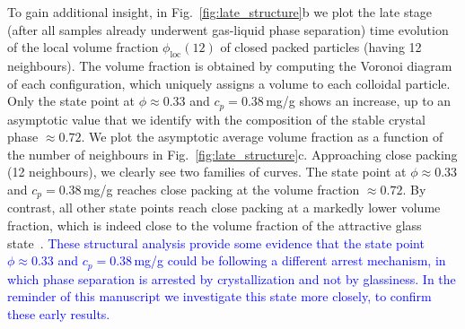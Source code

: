 \documentclass[preprint,amsmath,amssymb,superscriptaddress]{revtex4-1}
\begin{document}
To gain additional insight, in Fig.~\ref{fig:late_structure}b we plot the late stage (after all samples already underwent gas-liquid phase separation) time evolution of the local volume fraction $\phi_\mathrm{loc}(12)$ of closed packed particles (having 12 neighbours). The volume fraction is obtained by computing the Voronoi diagram of each configuration, which uniquely assigns a volume to each colloidal particle. Only the state point at $\phi\approx 0.33$ and $c_p = 0.38\,$mg/g shows an increase, up to an asymptotic value that we identify with the composition of the stable crystal phase $\approx 0.72$. We plot the asymptotic average volume fraction as a function of the number of neighbours in Fig.~\ref{fig:late_structure}c. Approaching close packing (12 neighbours), we clearly see two families of curves. The state point at $\phi\approx 0.33$ and $c_p=0.38\,$mg/g reaches close packing at the volume fraction $\approx 0.72$. By contrast, all other state points reach close packing at a markedly 
lower volume fraction, which is indeed close to the volume fraction of the attractive glass state~\cite{pham2002multiple}.  \textcolor{blue}{These structural analysis provide some evidence that the state point $\phi\approx 0.33$ and $c_p=0.38\,$mg/g could be following a different arrest mechanism, in which phase separation is arrested by crystallization and not by glassiness. In the reminder of this manuscript we investigate this state more closely, to confirm these early results.}


\end{document}
